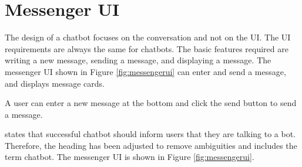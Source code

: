 \section{Messenger UI}
The design of a chatbot focuses on the conversation and not on the UI.
The UI requirements are always the same for chatbots.
The basic features required are writing a new message, sending a message, and displaying a message.
The messenger UI shown in Figure \ref{fig:messengerui} can enter and send 
a message, and displays message cards.

A user can enter a new message at the bottom and click the send button to send a message.


\citet{brandtzaeg2018chatbots} states that successful chatbot should inform users that they are talking to a bot.
Therefore, the heading has been adjusted to remove ambiguities and includes the term chatbot.
The messenger UI is shown in Figure \ref{fig:messengerui}. 


